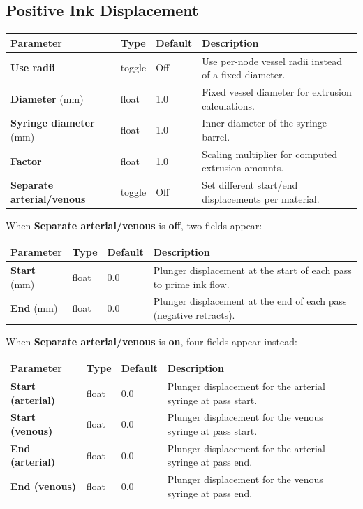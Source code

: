 \documentclass[11pt,letterpaper]{article}
\newcommand{\gui}[1]{\textcolor{guicolor}{\textsf{\textbf{#1}}}}
\begin{document}
\subsection{Positive Ink Displacement}

\begin{tabularx}{\textwidth}{L{3.5cm} l l X}
\toprule
\textbf{Parameter} & \textbf{Type} & \textbf{Default} & \textbf{Description} \\
\midrule
\gui{Use radii} & toggle & Off & Use per-node vessel radii instead of a fixed diameter. \\
\gui{Diameter} (mm) & float & 1.0 & Fixed vessel diameter for extrusion calculations. \\
\gui{Syringe diameter} (mm) & float & 1.0 & Inner diameter of the syringe barrel. \\
\gui{Factor} & float & 1.0 & Scaling multiplier for computed extrusion amounts. \\
\gui{Separate arterial/venous} & toggle & Off & Set different start/end displacements per material. \\
\bottomrule
\end{tabularx}

When \gui{Separate arterial/venous} is \textbf{off}, two fields appear:

\begin{tabularx}{\textwidth}{L{3.5cm} l l X}
\toprule
\textbf{Parameter} & \textbf{Type} & \textbf{Default} & \textbf{Description} \\
\midrule
\gui{Start} (mm) & float & 0.0 & Plunger displacement at the start of each pass to prime ink flow. \\
\gui{End} (mm) & float & 0.0 & Plunger displacement at the end of each pass (negative retracts). \\
\bottomrule
\end{tabularx}

When \gui{Separate arterial/venous} is \textbf{on}, four fields appear instead:

\begin{tabularx}{\textwidth}{L{3.5cm} l l X}
\toprule
\textbf{Parameter} & \textbf{Type} & \textbf{Default} & \textbf{Description} \\
\midrule
\gui{Start (arterial)} & float & 0.0 & Plunger displacement for the arterial syringe at pass start. \\
\gui{Start (venous)} & float & 0.0 & Plunger displacement for the venous syringe at pass start. \\
\gui{End (arterial)} & float & 0.0 & Plunger displacement for the arterial syringe at pass end. \\
\gui{End (venous)} & float & 0.0 & Plunger displacement for the venous syringe at pass end. \\
\bottomrule
\end{tabularx}
\end{document}
